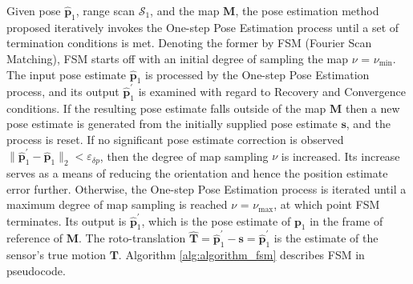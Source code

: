 Given pose $\hat{\bm{p}}_1$, range scan $\mathcal{S}_1$, and the map $\bm{M}$,
the pose estimation method proposed iteratively invokes the One-step Pose
Estimation process until a set of termination conditions is met. Denoting the
former by FSM (Fourier Scan Matching), FSM starts off with an initial degree of
sampling the map $\nu$ = $\nu_{\min}$. The input pose estimate
$\hat{\bm{p}}_1$ is processed by the One-step Pose Estimation process, and its
output $\hat{\bm{p}}_1^\prime$ is examined with regard to Recovery and
Convergence conditions. If the resulting pose estimate falls outside of the map
$\bm{M}$ then a new pose estimate is generated from the initially supplied pose
estimate $\bm{s}$, and the process is reset.  If no significant pose estimate
correction is observed $\|\hat{\bm{p}}_1^\prime-\hat{\bm{p}}_1\|_2 <
\varepsilon_{\delta p}$, then the degree of map sampling $\nu$ is increased.
Its increase serves as a means of reducing the orientation and hence the
position estimate error further.  Otherwise, the One-step Pose Estimation
process is iterated until a maximum degree of map sampling is reached $\nu$ =
$\nu_{\max}$, at which point FSM terminates. Its output is
$\hat{\bm{p}}_1^\prime$, which is the pose estimate of $\bm{p}_1$ in the frame
of reference of $\bm{M}$. The roto-translation
$\hat{\bm{T}} = \hat{\bm{p}}_1^\prime - \bm{s} = \hat{\bm{p}}_1^\prime$ is the
estimate of the sensor's true motion $\bm{T}$. Algorithm \ref{alg:algorithm_fsm}
describes FSM in pseudocode.

